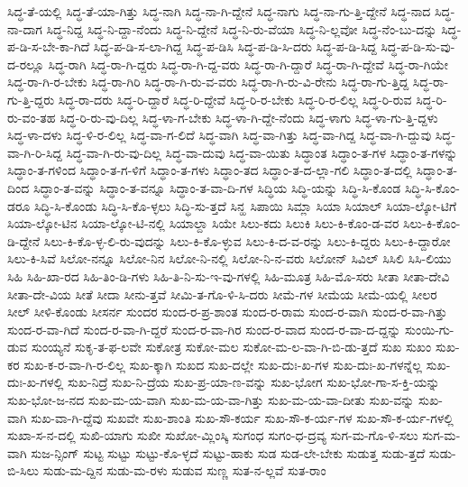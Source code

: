 {ಸಿದ್ಧ-ತೆ-ಯಲ್ಲಿ
ಸಿದ್ಧ-ತೆ-ಯಾ-ಗಿತ್ತು
ಸಿದ್ಧ-ನಾಗಿ
ಸಿದ್ಧ-ನಾ-ಗಿ-ದ್ದೇನೆ
ಸಿದ್ಧ-ನಾಗು
ಸಿದ್ಧ-ನಾ-ಗು-ತ್ತಿ-ದ್ದೇನೆ
ಸಿದ್ಧ-ನಾದ
ಸಿದ್ಧ-ನಾ-ದಾಗ
ಸಿದ್ಧ-ನಿದ್ದ
ಸಿದ್ಧ-ನಿ-ದ್ದಾ-ನೆಂದು
ಸಿದ್ಧ-ನಿ-ದ್ದೇನೆ
ಸಿದ್ಧ-ನಿ-ರು-ವೆಯಾ
ಸಿದ್ಧ-ನಿ-ಲ್ಲವೋ
ಸಿದ್ಧ-ನೆಂ-ಬು-ದನ್ನು
ಸಿದ್ಧ-ಪ-ಡಿ-ಸ-ಬೇ-ಕಾ-ಗಿದೆ
ಸಿದ್ಧ-ಪ-ಡಿ-ಸ-ಲಾ-ಗಿದ್ದ
ಸಿದ್ಧ-ಪ-ಡಿಸಿ
ಸಿದ್ಧ-ಪ-ಡಿ-ಸಿ-ದರು
ಸಿದ್ಧ-ಪ-ಡಿ-ಸಿದ್ದ
ಸಿದ್ಧ-ಪ-ಡಿ-ಸು-ವು-ದ-ರಲ್ಲೂ
ಸಿದ್ಧ-ರಾಗಿ
ಸಿದ್ಧ-ರಾ-ಗಿ-ದ್ದರು
ಸಿದ್ಧ-ರಾ-ಗಿ-ದ್ದ-ವರು
ಸಿದ್ಧ-ರಾ-ಗಿ-ದ್ದಾರೆ
ಸಿದ್ಧ-ರಾ-ಗಿ-ದ್ದೇವೆ
ಸಿದ್ಧ-ರಾ-ಗಿಯೇ
ಸಿದ್ಧ-ರಾ-ಗಿ-ರ-ಬೇಕು
ಸಿದ್ಧ-ರಾ-ಗಿರಿ
ಸಿದ್ಧ-ರಾ-ಗಿ-ರು-ವ-ವರು
ಸಿದ್ಧ-ರಾ-ಗಿ-ರು-ವಿ-ರೇನು
ಸಿದ್ಧ-ರಾ-ಗು-ತ್ತಿದ್ದ
ಸಿದ್ಧ-ರಾ-ಗು-ತ್ತಿ-ದ್ದರು
ಸಿದ್ಧ-ರಾ-ದರು
ಸಿದ್ಧ-ರಿ-ದ್ದಾರೆ
ಸಿದ್ಧ-ರಿ-ದ್ದೇವೆ
ಸಿದ್ಧ-ರಿ-ರ-ಬೇಕು
ಸಿದ್ಧ-ರಿ-ರ-ಲಿಲ್ಲ
ಸಿದ್ಧ-ರಿ-ರುವ
ಸಿದ್ಧ-ರಿ-ರು-ವಂ-ತಹ
ಸಿದ್ಧ-ರಿ-ರು-ವು-ದಿಲ್ಲ
ಸಿದ್ಧ-ಳಾ-ಗ-ಬೇಕು
ಸಿದ್ಧ-ಳಾ-ಗಿ-ದ್ದೇ-ನೆಂದು
ಸಿದ್ಧ-ಳಾಗು
ಸಿದ್ಧ-ಳಾ-ಗು-ತ್ತಿ-ದ್ದಳು
ಸಿದ್ಧ-ಳಾ-ದಳು
ಸಿದ್ಧ-ಳಿ-ರ-ಲಿಲ್ಲ
ಸಿದ್ಧ-ವಾ-ಗ-ಲಿದೆ
ಸಿದ್ಧ-ವಾಗಿ
ಸಿದ್ಧ-ವಾ-ಗಿತ್ತು
ಸಿದ್ಧ-ವಾ-ಗಿದ್ದ
ಸಿದ್ಧ-ವಾ-ಗಿ-ದ್ದುವು
ಸಿದ್ಧ-ವಾ-ಗಿ-ರಿ-ಸಿದ್ದ
ಸಿದ್ಧ-ವಾ-ಗಿ-ರು-ವು-ದಿಲ್ಲ
ಸಿದ್ಧ-ವಾ-ದುವು
ಸಿದ್ಧ-ವಾ-ಯಿತು
ಸಿದ್ಧಾಂತ
ಸಿದ್ಧಾಂ-ತ-ಗಳ
ಸಿದ್ಧಾಂ-ತ-ಗಳನ್ನು
ಸಿದ್ಧಾಂ-ತ-ಗಳಿಂದ
ಸಿದ್ಧಾಂ-ತ-ಗ-ಳಿಗೆ
ಸಿದ್ಧಾಂ-ತ-ಗಳು
ಸಿದ್ಧಾಂ-ತದ
ಸಿದ್ಧಾಂ-ತ-ದ-ಲ್ಲಾ-ಗಲಿ
ಸಿದ್ಧಾಂ-ತ-ದಲ್ಲಿ
ಸಿದ್ಧಾಂ-ತ-ದಿಂದ
ಸಿದ್ಧಾಂ-ತ-ವನ್ನು
ಸಿದ್ಧಾಂ-ತ-ವನ್ನೂ
ಸಿದ್ಧಾಂ-ತ-ವಾ-ದಿ-ಗಳ
ಸಿದ್ಧಿಯ
ಸಿದ್ಧಿ-ಯನ್ನು
ಸಿದ್ಧಿ-ಸಿ-ಕೊಂಡ
ಸಿದ್ಧಿ-ಸಿ-ಕೊಂ-ಡರೂ
ಸಿದ್ಧಿ-ಸಿ-ಕೊಂಡು
ಸಿದ್ಧಿ-ಸಿ-ಕೊ-ಳ್ಳಲು
ಸಿದ್ಧಿ-ಸು-ತ್ತದೆ
ಸಿನ್ಹ
ಸಿಪಾಯಿ
ಸಿಮ್ಲಾ
ಸಿಯಾ
ಸಿಯಾಲ್
ಸಿಯಾ-ಲ್ಕೋ-ಟಿಗೆ
ಸಿಯಾ-ಲ್ಕೋ-ಟಿನ
ಸಿಯಾ-ಲ್ಕೋ-ಟಿ-ನಲ್ಲಿ
ಸಿಯಾಲ್ದಾ
ಸಿಯೇ
ಸಿಲು-ಕದು
ಸಿಲುಕಿ
ಸಿಲು-ಕಿ-ಕೊಂ-ಡ-ವರ
ಸಿಲು-ಕಿ-ಕೊಂ-ಡಿ-ದ್ದೇನೆ
ಸಿಲು-ಕಿ-ಕೊ-ಳ್ಳ-ಲಿ-ರು-ವುದನ್ನು
ಸಿಲು-ಕಿ-ಕೊ-ಳ್ಳುವ
ಸಿಲು-ಕಿ-ದ-ವ-ರನ್ನು
ಸಿಲು-ಕಿ-ದ್ದರು
ಸಿಲು-ಕಿ-ದ್ದಾರೋ
ಸಿಲು-ಕಿ-ಸಿವೆ
ಸಿಲೋ-ನನ್ನೂ
ಸಿಲೋ-ನಿನ
ಸಿಲೋ-ನಿ-ನಲ್ಲಿ
ಸಿಲೋ-ನಿ-ನ-ವರು
ಸಿಲೋನ್
ಸಿವಿಲ್
ಸಿಸಿಲಿ
ಸಿಸಿ-ಲಿಯು
ಸಿಹಿ
ಸಿಹಿ-ಖಾ-ರದ
ಸಿಹಿ-ತಿಂ-ಡಿ-ಗಳು
ಸಿಹಿ-ತಿ-ನಿ-ಸು-ಇ-ವು-ಗಳಲ್ಲಿ
ಸಿಹಿ-ಮೂತ್ರ
ಸಿಹಿ-ಮೊ-ಸರು
ಸೀತಾ
ಸೀತಾ-ದೇವಿ
ಸೀತಾ-ದೇ-ವಿಯ
ಸೀತೆ
ಸೀದಾ
ಸೀನು-ತ್ತವೆ
ಸೀಮಿ-ತ-ಗೊ-ಳಿ-ಸಿ-ದರು
ಸೀಮೆ-ಗಳ
ಸೀಮೆಯ
ಸೀಮೆ-ಯಲ್ಲಿ
ಸೀಲರ
ಸೀಲ್
ಸೀಳಿ-ಕೊಂಡು
ಸೀಸರ್ನ
ಸುಂದರ
ಸುಂದ-ರ-ಪ್ರ-ಶಾಂತ
ಸುಂದ-ರ-ರಾಮ
ಸುಂದ-ರ-ವಾಗಿ
ಸುಂದ-ರ-ವಾ-ಗಿತ್ತು
ಸುಂದ-ರ-ವಾ-ಗಿದೆ
ಸುಂದ-ರ-ವಾ-ಗಿ-ದ್ದರೆ
ಸುಂದ-ರ-ವಾ-ಗಿರ
ಸುಂದ-ರ-ವಾದ
ಸುಂದ-ರ-ವಾ-ದ-ದ್ದನ್ನು
ಸುಂಯಿ-ಗು-ಡುವ
ಸುಂಯ್ಯನೆ
ಸುಕೃ-ತ-ಫ-ಲವೇ
ಸುಕೋತ್ರ
ಸುಕೋ-ಮಲ
ಸುಕೋ-ಮ-ಲ-ವಾ-ಗಿ-ಬಿ-ಡು-ತ್ತದೆ
ಸುಖ
ಸುಖಂ
ಸುಖ-ಕರ
ಸುಖ-ಕ-ರ-ವಾ-ಗಿ-ರ-ಲಿಲ್ಲ
ಸುಖ-ಕ್ಕಾಗಿ
ಸುಖದ
ಸುಖ-ದಲ್ಲೇ
ಸುಖ-ದುಃ-ಖ-ಗಳ
ಸುಖ-ದುಃ-ಖ-ಗಳನ್ನೆಲ್ಲ
ಸುಖ-ದುಃ-ಖ-ಗಳಲ್ಲಿ
ಸುಖ-ನಿದ್ರೆ
ಸುಖ-ನಿ-ದ್ರೆಯ
ಸುಖ-ಪ್ರ-ಯಾ-ಣ-ವನ್ನು
ಸುಖ-ಭೋಗ
ಸುಖ-ಭೋ-ಗಾ-ಸ-ಕ್ತಿ-ಯನ್ನು
ಸುಖ-ಭೋ-ಜ-ನದ
ಸುಖ-ಮ-ಯ-ವಾಗಿ
ಸುಖ-ಮ-ಯ-ವಾ-ಗಿತ್ತು
ಸುಖ-ಮ-ಯ-ವಾ-ದೀತು
ಸುಖ-ವನ್ನು
ಸುಖ-ವಾಗಿ
ಸುಖ-ವಾ-ಗಿ-ದ್ದೆವು
ಸುಖವೇ
ಸುಖ-ಶಾಂತಿ
ಸುಖ-ಸೌ-ಕರ್ಯ
ಸುಖ-ಸೌ-ಕ-ರ್ಯ-ಗಳ
ಸುಖ-ಸೌ-ಕ-ರ್ಯ-ಗಳಲ್ಲಿ
ಸುಖಾ-ಸ-ನ-ದಲ್ಲಿ
ಸುಖಿ-ಯಾಗು
ಸುಖೀ
ಸುಖೋ-ಮ್ಲಿಂಸ್ಕಿ
ಸುಗಂಧ
ಸುಗಂ-ಧ-ದ್ರವ್ಯ
ಸುಗ-ಮ-ಗೊ-ಳಿ-ಸಲು
ಸುಗ-ಮ-ವಾಗಿ
ಸುಜ-ನ್ಸಿಂಗ್
ಸುಟ್ಟ
ಸುಟ್ಟು
ಸುಟ್ಟು-ಕೊ-ಳ್ಳದೆ
ಸುಟ್ಟು-ಹಾಕು
ಸುಡ
ಸುಡ-ಲೇ-ಬೇಕು
ಸುಡುತ್ತ
ಸುಡು-ತ್ತದೆ
ಸುಡು-ಬಿ-ಸಿಲು
ಸುಡು-ಮ-ದ್ದಿನ
ಸುಡು-ಮ-ರಳು
ಸುಡುವ
ಸುಣ್ಣ
ಸುತ-ನ-ಲ್ಲವೆ
ಸುತ-ರಾಂ
}
